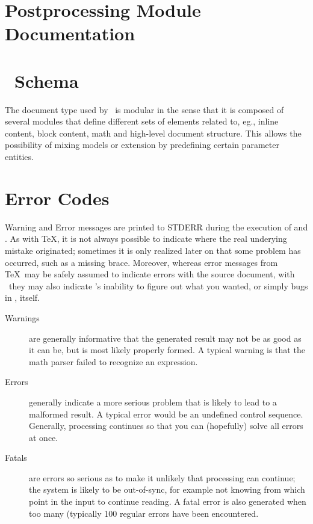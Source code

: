 \documentclass{book}
\begin{document}
\chapter[Postprocessing Modules]{Postprocessing Module Documentation}\label{postmodules}


\chapter[Schema]{\LaTeXML\ Schema}\label{schema}
The document type used by \LaTeXML\ is modular in the sense
that it is composed of several modules that define different
sets of elements related to, eg., inline content, block content,
math and high-level document structure.  This allows the possibility
of mixing models or extension by predefining certain parameter entities.



\chapter{Error Codes}\label{errorcodes}
Warning and Error messages are printed to STDERR during the execution
of  and .  As with \TeX, it is
not always possible to indicate where the real underying mistake
originated; sometimes it is only realized later on that some problem
has occurred, such as a missing brace. Moreover, whereas error messages
from \TeX\ may be safely assumed to indicate errors with the source
document, with \LaTeXML\ they may also indicate \LaTeXML's inability
to figure out what you wanted, or simply bugs in \LaTeXML, itself.

\begin{description}
\item[Warnings] are generally
informative that the generated result may not be as good as it can be,
but is most likely properly formed.  A typical warning is that
the math parser failed to recognize an expression.
\item[Errors] generally indicate a more serious problem that is likely
to lead to a malformed result.  A typical error would be an undefined
control sequence.  Generally, processing continues so that you can
(hopefully) solve all errors at once.
\item[Fatals] are errors so serious as to make it unlikely that processing
can continue; the system is likely to be out-of-sync, for example
not knowing from which  point in the input to continue reading.
A fatal error is also generated when too many (typically 100 regular errors
have been encountered.
\end{description}
\end{document}
